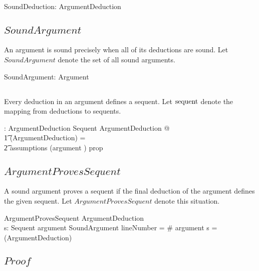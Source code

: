 \documentclass[11pt, oneside]{article}
\begin{document}
\begin{axdef}
	SoundDeduction: \power ArgumentDeduction
\end{axdef}

\subsection{$SoundArgument$}

An argument is sound precisely when all of its deductions are sound.
Let $SoundArgument$ denote the set of all sound arguments.

\begin{axdef}
	SoundArgument: \power Argument
\end{axdef}

\subsection{}

Every deduction in an argument defines a sequent.
Let $\operatorname{sequent}$ denote the mapping from deductions to sequents.

\begin{axdef}
	\deductionSequent: ArgumentDeduction \fun Sequent
\where
	\forall ArgumentDeduction @ \\
	\t1	\deductionSequent(\theta ArgumentDeduction) = \\
	\t2		assumptions \extract (argument \comp \deductionProp) \sequent prop
\end{axdef}

\subsection{$ArgumentProvesSequent$}

A sound argument proves a sequent if the final deduction of the argument defines the given sequent.
Let $ArgumentProvesSequent$ denote this situation.

\begin{schema}{ArgumentProvesSequent}
	ArgumentDeduction \\
	s: Sequent
\where
	argument \in SoundArgument
\also
	lineNumber = \# argument
\also
	s = \deductionSequent(\theta ArgumentDeduction)
\end{schema}

\subsection{$Proof$}
\end{document}
